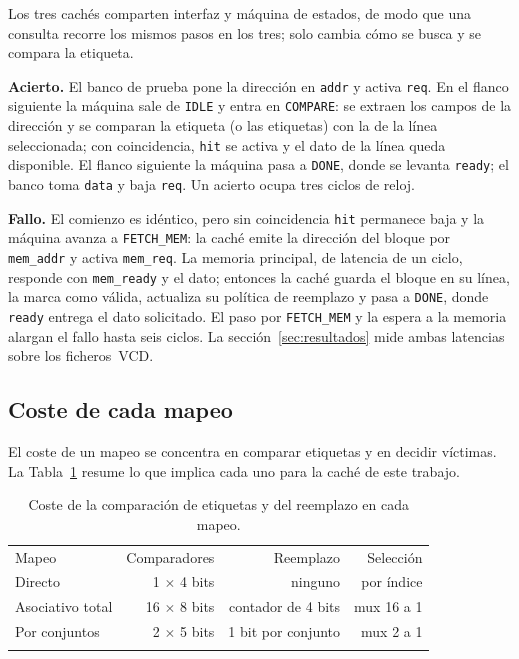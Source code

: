 \documentclass[llncs]{llncs}
\begin{document}
Los tres cachés comparten interfaz y máquina de estados, de modo que
una consulta recorre los mismos pasos en los tres; solo cambia cómo
se busca y se compara la etiqueta.

\textbf{Acierto.} El banco de prueba pone la dirección en
\texttt{addr} y activa \texttt{req}. En el flanco siguiente la
máquina sale de \texttt{IDLE} y entra en \texttt{COMPARE}: se extraen
los campos de la dirección y se comparan la etiqueta (o las
etiquetas) con la de la línea seleccionada; con coincidencia,
\texttt{hit} se activa y el dato de la línea queda disponible. El
flanco siguiente la máquina pasa a \texttt{DONE}, donde se levanta
\texttt{ready}; el banco toma \texttt{data} y baja \texttt{req}. Un
acierto ocupa tres ciclos de reloj.

\textbf{Fallo.} El comienzo es idéntico, pero sin coincidencia
\texttt{hit} permanece baja y la máquina avanza a
\texttt{FETCH\_MEM}: la caché emite la dirección del bloque por
\texttt{mem\_addr} y activa \texttt{mem\_req}. La memoria principal,
de latencia de un ciclo, responde con \texttt{mem\_ready} y el dato;
entonces la caché guarda el bloque en su línea, la marca como válida,
actualiza su política de reemplazo y pasa a \texttt{DONE}, donde
\texttt{ready} entrega el dato solicitado. El paso por
\texttt{FETCH\_MEM} y la espera a la memoria alargan el fallo hasta
seis ciclos. La sección~\ref{sec:resultados} mide ambas latencias
sobre los ficheros~VCD.

\subsection{Coste de cada mapeo}

El coste de un mapeo se concentra en comparar etiquetas y en decidir
víctimas. La Tabla~\ref{tab:coste} resume lo que implica cada uno
para la caché de este trabajo.

\begin{table}[t]
\centering
\small
\begin{tabular}{@{}lrrr@{}}
\hline\noalign{\smallskip}
Mapeo & Comparadores & Reemplazo & Selección \\
\noalign{\smallskip}\hline\noalign{\smallskip}
Directo & 1 $\times$ 4 bits & ninguno & por índice \\
Asociativo total & 16 $\times$ 8 bits & contador de 4 bits & mux 16 a 1 \\
Por conjuntos & 2 $\times$ 5 bits & 1 bit por conjunto & mux 2 a 1 \\
\noalign{\smallskip}\hline
\end{tabular}
\caption{Coste de la comparación de etiquetas y del reemplazo en cada mapeo.}
\label{tab:coste}
\end{table}
\end{document}
